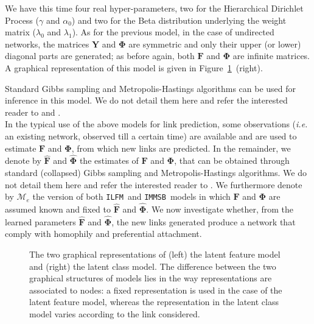 \documentclass[conference]{IEEEtran}
\newcommand*{\lpath}{./}
\newcommand{\ifm}{\texttt{ILFM}}
\newcommand{\imb}{\texttt{IMMSB}}
\newcommand{\mat}[1]{\mathbf{#1}}
\begin{document}
%
We have this time four real hyper-parameters, two for the Hierarchical Dirichlet Process ($\gamma$ and $\alpha_0$) and two for the Beta distribution underlying the weight matrix ($\lambda_0$ and $\lambda_1$). As for the previous model, in the case of undirected networks, the matrices $\mat{Y}$ and $\mat{\Phi}$ are symmetric and only their upper (or lower) diagonal parts are generated; as before again, both $\mat{F}$ and $\mat{\Phi}$ are infinite matrices. A graphical representation of this model is given in Figure~\ref{fig:mmm}~(right).

Standard Gibbs sampling and Metropolis-Hastings algorithms can be used for inference in this model. We do not detail them here and refer the interested reader to \cite{ILFRM} and \cite{IBP}.~\\

In the typical use of the above models for link prediction, some observations (\textit{i.e.} an existing network, observed till a certain time) are available and are used to estimate $\mat{F}$ and $\mat{\Phi}$, from which new links are predicted. In the remainder, we denote by $\mat{\hat{F}}$ and $\mat{\hat{\Phi}}$ the estimates of $\mat{F}$ and $\mat{\Phi}$, that can be obtained through standard (collapsed) Gibbs sampling and Metropolis-Hastings algorithms. We do not detail them here and refer the interested reader to \cite{ILFRM,IBP,HDP,fan2015dynamic}. We furthermore denote by $\mathcal{M}_e$ the version of both \ifm\ and \imb\ models in which $\mat{F}$ and $\mat{\Phi}$ are assumed known and fixed to $\mat{\hat{F}}$ and $\mat{\hat{\Phi}}$. We now investigate whether, from the learned parameters $\mat{\hat{F}}$ and $\mat{\hat{\Phi}}$, the new links generated produce a network that comply with homophily and preferential attachment.

\begin{figure}[t]
	\centering
	\vspace{1cm}
	\scalebox{0.88}{
	}
	\endminipage
	\scalebox{0.88}{
		}
	\endminipage
	\caption{The two graphical representations of (left) the latent feature model and (right) the latent class model. The difference between the two graphical structures of  models lies in the way representations are associated to nodes: a fixed representation is used in the case of the latent feature model, whereas the representation in the latent class model varies according to the link considered.}
	\label{fig:mmm}
\end{figure}
\end{document}

